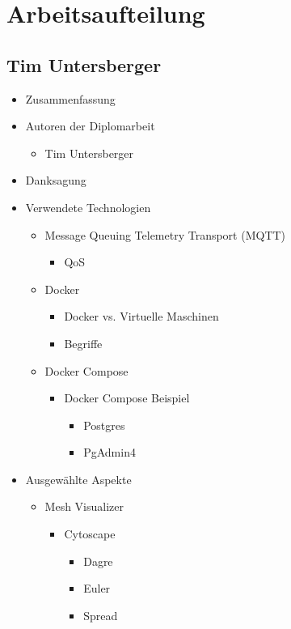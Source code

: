\chapter{Arbeitsaufteilung}

\section*{Tim Untersberger}

\begin{itemize}
	\item Zusammenfassung
	\item Autoren der Diplomarbeit
	\begin{itemize}
		\item Tim Untersberger
	\end{itemize}
	\item Danksagung
	\item Verwendete Technologien
	\begin{itemize}
		\item Message Queuing Telemetry Transport (MQTT)
		\begin{itemize}
			\item QoS
		\end{itemize}
		\item Docker
		\begin{itemize}
			\item Docker vs. Virtuelle Maschinen
			\item Begriffe
		\end{itemize}
		\item Docker Compose
		\begin{itemize}
			\item Docker Compose Beispiel
			\begin{itemize}
				\item Postgres
				\item PgAdmin4
			\end{itemize}
		\end{itemize}
	\end{itemize}
	\item Ausgewählte Aspekte
	\begin{itemize}
		\item Mesh Visualizer
		\begin{itemize}
			\item Cytoscape
			\begin{itemize}
				\item Dagre
				\item Euler
				\item Spread

\end{itemize}
\end{itemize}
\end{itemize}
\end{itemize}
